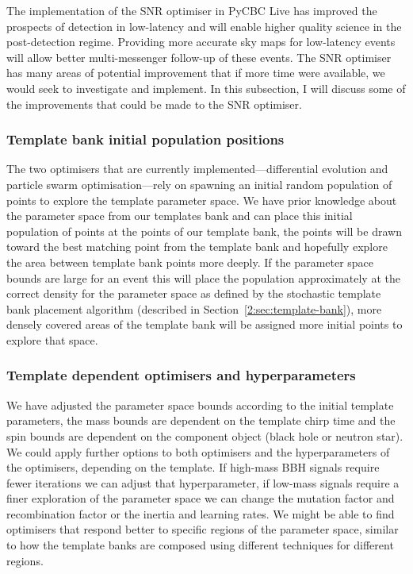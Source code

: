The implementation of the SNR optimiser in PyCBC Live has improved the prospects of \gwadj detection in low-latency and will enable higher quality science in the post-detection regime. Providing more accurate sky maps for low-latency events will allow better multi-messenger follow-up of these events. The SNR optimiser has many areas of potential improvement that if more time were available, we would seek to investigate and implement. In this subsection, I will discuss some of the improvements that could be made to the SNR optimiser.

\subsubsection{Template bank initial population positions}

% 

The two optimisers that are currently implemented---differential evolution and particle swarm optimisation---rely on spawning an initial random population of points to explore the template parameter space. We have prior knowledge about the parameter space from our templates bank and can place this initial population of points at the points of our template bank, the points will be drawn toward the best matching point from the template bank and hopefully explore the area between template bank points more deeply. If the parameter space bounds are large for an event this will place the population approximately at the correct density for the parameter space as defined by the stochastic template bank placement algorithm (described in Section~\ref{2:sec:template-bank}), more densely covered areas of the template bank will be assigned more initial points to explore that space.

\subsubsection{Template dependent optimisers and hyperparameters}

We have adjusted the parameter space bounds according to the initial template parameters, the mass bounds are dependent on the template chirp time and the spin bounds are dependent on the component object (black hole or neutron star). We could apply further options to both optimisers and the hyperparameters of the optimisers, depending on the template. If high-mass BBH signals require fewer iterations we can adjust that hyperparameter, if low-mass signals require a finer exploration of the parameter space we can change the mutation factor and recombination factor or the inertia and learning rates. We might be able to find optimisers that respond better to specific regions of the parameter space, similar to how the template banks are composed using different techniques for different regions.


